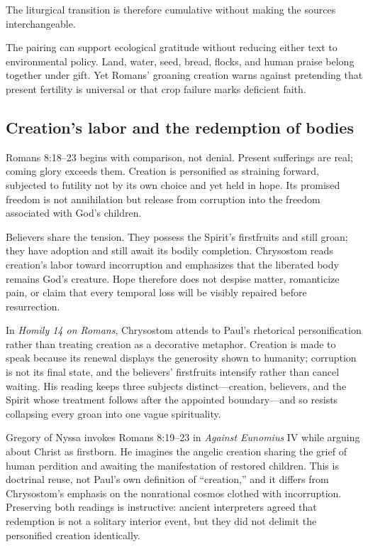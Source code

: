 \begin{deepstudy}
The liturgical transition is therefore cumulative without making the sources interchangeable.

The pairing can support ecological gratitude without reducing either text to environmental policy. Land, water, seed, bread, flocks, and human praise belong together under gift. Yet Romans' groaning creation warns against pretending that present fertility is universal or that crop failure marks deficient faith.

\subsection*{Creation's labor and the redemption of bodies\enspace{}}

Romans 8:18--23 begins with comparison, not denial. Present sufferings are real; coming glory exceeds them. Creation is personified as straining forward, subjected to futility not by its own choice and yet held in hope. Its promised freedom is not annihilation but release from corruption into the freedom associated with God's children.

Believers share the tension. They possess the Spirit's firstfruits and still groan; they have adoption and still await its bodily completion. Chrysostom reads creation's labor toward incorruption and emphasizes that the liberated body remains God's creature. Hope therefore does not despise matter, romanticize pain, or claim that every temporal loss will be visibly repaired before resurrection.

In \emph{Homily 14 on Romans}, Chrysostom attends to Paul's rhetorical personification rather than treating creation as a decorative metaphor. Creation is made to speak because its renewal displays the generosity shown to humanity; corruption is not its final state, and the believers' firstfruits intensify rather than cancel waiting. His reading keeps three subjects distinct---creation, believers, and the Spirit whose treatment follows after the appointed boundary---and so resists collapsing every groan into one vague spirituality.

Gregory of Nyssa invokes Romans 8:19--23 in \emph{Against Eunomius} IV while arguing about Christ as firstborn. He imagines the angelic creation sharing the grief of human perdition and awaiting the manifestation of restored children. This is doctrinal reuse, not Paul's own definition of “creation,” and it differs from Chrysostom's emphasis on the nonrational cosmos clothed with incorruption. Preserving both readings is instructive: ancient interpreters agreed that redemption is not a solitary interior event, but they did not delimit the personified creation identically.


\end{deepstudy}

